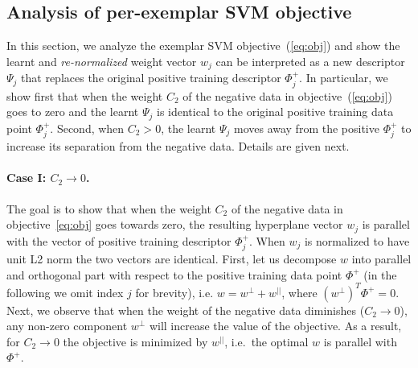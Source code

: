 \documentclass[10pt,twocolumn,letterpaper]{article}
\begin{document}
   \subsection{Analysis of per-exemplar SVM objective} %
      In this section, we analyze the exemplar SVM objective~(\ref{eq:obj}) and show the learnt and {\em re-normalized} weight vector $w_j$ can be interpreted as a new descriptor $\Psi_j$ that replaces the original positive training descriptor $\Phi^+_j$.  In particular, we show first that when the weight $C_2$ of the negative data in objective~(\ref{eq:obj}) goes to zero and the learnt $\Psi_j$ is identical to the original positive training data point $\Phi_j^+$.  Second, when $C_2>0$, the learnt $\Psi_j$ moves away from the positive $\Phi_j^+$ to increase its separation from the negative data.
      Details are given next.

      \paragraph{Case I: $C_2\rightarrow 0$.}
         The goal is to show that when the weight  $C_2$ of the negative data in objective~\eqref{eq:obj} goes towards zero, the resulting hyperplane vector $w_j$ is parallel with the vector of positive training descriptor $\Phi_j^+$. When $w_j$ is normalized to have unit L2 norm the two vectors are identical. First, let us decompose $w$ into parallel and orthogonal part with respect to the positive training data point $\Phi^+$ (in the following we omit index $j$ for brevity), i.e. $w=w^{\perp}+w^{||}$, where $(w^{\perp})^T \Phi^+ = 0$. Next, we observe that when the weight of the negative data diminishes ($C_2\rightarrow 0$), any non-zero component $w^{\perp}$ will increase the value of the objective. As a result, for $C_2\rightarrow 0$ the objective is minimized by $w^{||}$, i.e.\ the optimal $w$ is parallel with $\Phi^+$.
\end{document}
